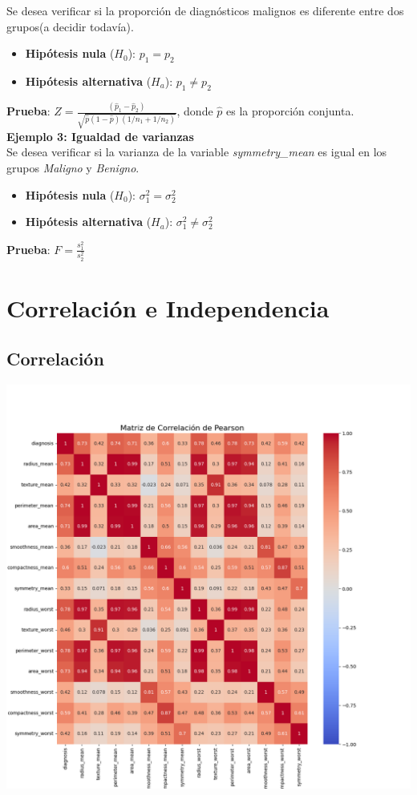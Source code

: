 \documentclass[a4paper, 12pt]{article}
\begin{document}
Se desea verificar si la proporción de diagnósticos malignos es diferente entre dos grupos(a decidir todavía).

\begin{itemize}
	\item \textbf{Hipótesis nula} (\(H_0\)): \(p_1 = p_2\)
	\item \textbf{Hipótesis alternativa} (\(H_a\)): \(p_1 \neq p_2\)
\end{itemize}

\textbf{Prueba}: \(Z = \frac{(\hat{p}_1 - \hat{p}_2)}{\sqrt{\hat{p}(1-\hat{p})(1/n_1 + 1/n_2)}}\), donde \(\hat{p}\) es la proporción conjunta.\\

\textbf{Ejemplo 3: Igualdad de varianzas}\\

Se desea verificar si la varianza de la variable \textit{symmetry\_mean} es igual en los grupos \textit{Maligno} y \textit{Benigno}.

\begin{itemize}
	\item \textbf{Hipótesis nula} (\(H_0\)): \(\sigma_1^2 = \sigma_2^2\)
	\item \textbf{Hipótesis alternativa} (\(H_a\)): \(\sigma_1^2 \neq \sigma_2^2\)
\end{itemize}

\textbf{Prueba}: \(F = \frac{s_1^2}{s_2^2}\)


\newpage

\section{Correlación e Independencia}
\subsection{Correlación}
	\includegraphics[width = \textwidth]{../Plots/plots_corr/corr_matrix/matriz_correlacion_pearson.png}
\end{document}
